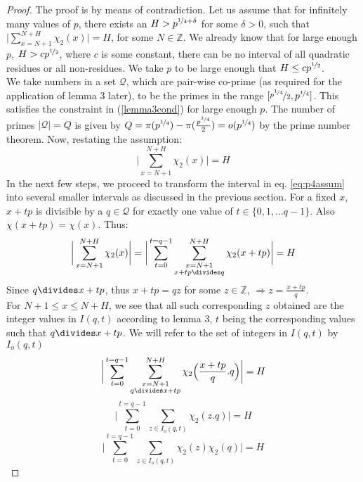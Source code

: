 \documentclass{report}
\begin{document}
\begin{proof}
The proof is by means of contradiction. Let us assume that for infinitely many values of $p$, there exists an $H>p^{\nicefrac{1}{4}+\delta}$ for some $\delta>0$, such that $\Big \lvert \sum\limits_{x=N+1}^{N+H}\chi_2(x)\Big \rvert=H$, for some $N\in \mathbb{Z}$. We already know that for large enough $p$, $H>cp^{\nicefrac{1}{2}}$, where $c$ is some constant, there can be no interval of all quadratic residues or all non-residues. We take $p$ to be large enough that $H\leq cp^{\nicefrac{1}{2}}$.\\
We take numbers in a set $\mathcal{Q}$, which are pair-wise co-prime (as required for the application of lemma 3 later), to be the primes in the range $[\nicefrac{p^{\nicefrac{1}{4}}}{2},p^{\nicefrac{1}{4}}]$.
This satisfies the constraint in (\ref{lemma3cond}) for large enough $p$. The number of primes $\lvert\mathcal{Q}\rvert=Q$ is given by $Q=\pi(p^{\nicefrac{1}{4}})-\pi(\frac{p^{\nicefrac{1}{4}}}{2})=o(p^{\nicefrac{1}{4}})$ by the prime number theorem. Now, restating the assumption:
\begin{equation} \label{eq:p4assum}
\bigg \lvert\sum\limits_{x=N+1}^{N+H}\chi_2(x)\bigg \rvert=H
\end{equation}
In the next few steps, we proceed to transform the interval in eq. \ref{eq:p4assum} into several smaller intervals as discussed in the previous section. For a fixed $x$, $x+tp$ is divisible by a $q\in\mathcal{Q}$ for exactly one value of $t\in\{0,1,...q-1\}$. Also $\chi(x+tp)=\chi(x)$. Thus:
\[
\bigg \lvert\sum\limits_{x=N+1}^{N+H}\chi_2(x)\bigg \rvert=\bigg \lvert\sum\limits_{t=0}^{t=q-1}\sum\limits_{\substack{x=N+1\\x+tp\divides q}}^{N+H}\chi_2(x+tp)\bigg \rvert=H
\]
Since $q\divides x+tp$, thus $x+tp=qz$ for some $z\in\mathbb{Z}$, $\Rightarrow z=\frac{x+tp}{q}$.\\
For $N+1\leq x \leq N+H$, we see that all such corresponding $z$ obtained are the integer values in $I(q,t)$ according to lemma 3, $t$ being the corresponding values such that $q \divides x+tp$. We will refer to the set of integers in $I(q,t)$ by $I_o(q,t)$
$$\bigg \lvert\sum\limits_{t=0}^{t=q-1}\sum\limits_{\substack{x=N+1\\q\divides x+tp}}^{N+H} \chi_2 \Big(\frac{x+tp}{q}.q\Big)\bigg \rvert=H$$
$$\bigg \lvert\sum\limits_{t=0}^{t=q-1}\sum\limits_{z\in I_o(q,t)}\chi_2(z.q)\bigg \rvert=H$$
\begin{equation} \label{chapter3refeq}
\bigg \lvert\sum\limits_{t=0}^{t=q-1}\sum\limits_{z\in I_o(q,t)}\chi_2(z)\chi_2(q)\bigg \rvert=H

\end{equation}
\end{proof}
\end{document}
